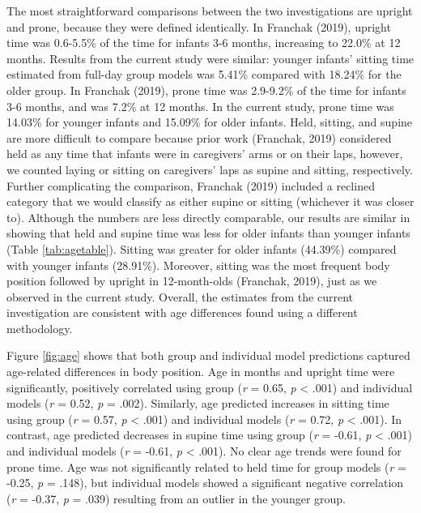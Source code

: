 \documentclass[
  man]{apa6}
\begin{document}
The most straightforward comparisons between the two investigations are upright and prone, because they were defined identically. In Franchak (2019), upright time was 0.6-5.5\% of the time for infants 3-6 months, increasing to 22.0\% at 12 months. Results from the current study were similar: younger infants' sitting time estimated from full-day group models was 5.41\% compared with 18.24\% for the older group. In Franchak (2019), prone time was 2.9-9.2\% of the time for infants 3-6 months, and was 7.2\% at 12 months. In the current study, prone time was 14.03\% for younger infants and 15.09\% for older infants. Held, sitting, and supine are more difficult to compare because prior work (Franchak, 2019) considered held as any time that infants were in caregivers' arms or on their laps, however, we counted laying or sitting on caregivers' laps as supine and sitting, respectively. Further complicating the comparison, Franchak (2019) included a reclined category that we would classify as either supine or sitting (whichever it was closer to). Although the numbers are less directly comparable, our results are similar in showing that held and supine time was less for older infants than younger infants (Table \ref{tab:agetable}). Sitting was greater for older infants (44.39\%) compared with younger infants (28.91\%). Moreover, sitting was the most frequent body position followed by upright in 12-month-olds (Franchak, 2019), just as we observed in the current study. Overall, the estimates from the current investigation are consistent with age differences found using a different methodology.

Figure \ref{fig:age} shows that both group and individual model predictions captured age-related differences in body position. Age in months and upright time were significantly, positively correlated using group (\emph{r} = 0.65, \emph{p} \textless{} .001) and individual models (\emph{r} = 0.52, \emph{p} = .002). Similarly, age predicted increases in sitting time using group (\emph{r} = 0.57, \emph{p} \textless{} .001) and individual models (\emph{r} = 0.72, \emph{p} \textless{} .001). In contrast, age predicted decreases in supine time using group (\emph{r} = -0.61, \emph{p} \textless{} .001) and individual models (\emph{r} = -0.61, \emph{p} \textless{} .001). No clear age trends were found for prone time. Age was not significantly related to held time for group models (\emph{r} = -0.25, \emph{p} = .148), but individual models showed a significant negative correlation (\emph{r} = -0.37, \emph{p} = .039) resulting from an outlier in the younger group.
\end{document}
